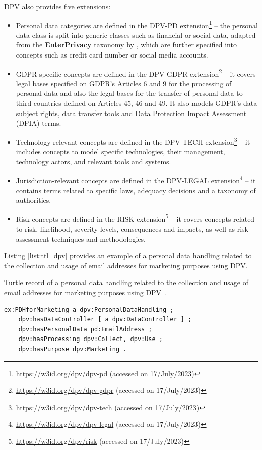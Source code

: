 DPV also provides five extensions:
\begin{itemize}
    \item Personal data categories are defined in the DPV-PD extension\footnote{\url{https://w3id.org/dpv/dpv-pd} (accessed on 17/July/2023)} -- the personal data class is split into generic classes such as financial or social data, adapted from the \textbf{EnterPrivacy} taxonomy by \cite{cronk_categories_2017}, which are further specified into concepts such as credit card number or social media accounts.
    \item GDPR-specific concepts are defined in the DPV-GDPR extension\footnote{\url{https://w3id.org/dpv/dpv-gdpr} (accessed on 17/July/2023)} -- it covers legal bases specified on GDPR's Articles 6 and 9 for the processing of personal data and also the legal bases for the transfer of personal data to third countries defined on Articles 45, 46 and 49. It also models GDPR's data subject rights, data transfer tools and Data Protection Impact Assessment (DPIA) terms.
    \item Technology-relevant concepts are defined in the DPV-TECH extension\footnote{\url{https://w3id.org/dpv/dpv-tech} (accessed on 17/July/2023)} -- it includes concepts to model specific technologies, their management, technology actors, and relevant tools and systems.
    \item Jurisdiction-relevant concepts are defined in the DPV-LEGAL extension\footnote{\url{https://w3id.org/dpv/dpv-legal} (accessed on 17/July/2023)} -- it contains terms related to specific laws, adequacy decisions and a taxonomy of authorities.
    \item Risk concepts are defined in the RISK extension\footnote{\url{https://w3id.org/dpv/risk} (accessed on 17/July/2023)} -- it covers concepts related to risk, likelihood, severity levels, consequences and impacts, as well as risk assessment techniques and methodologies.
\end{itemize}

Listing \ref{list:ttl_dpv} provides an example of a personal data handling related to the collection and usage of email addresses for marketing purposes using DPV.

\begin{listing}[ht]
\caption{Turtle record of a personal data handling related to the collection and usage of email addresses for marketing purposes using DPV~\citep{panetto_creating_2019}.}
\label{list:ttl_dpv}
\begin{verbatim}
ex:PDHforMarketing a dpv:PersonalDataHandling ;
    dpv:hasDataController [ a dpv:DataController ] ;
    dpv:hasPersonalData pd:EmailAddress ;
    dpv:hasProcessing dpv:Collect, dpv:Use ;
    dpv:hasPurpose dpv:Marketing .
\end{verbatim}
\end{listing}

